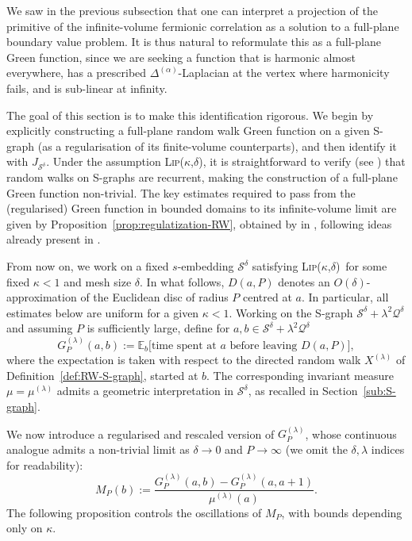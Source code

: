 \documentclass[reqno]{amsart}
\numberwithin{equation}{section}
\theoremstyle{definition}
\theoremstyle{remark}
\newcommand\cQ{\mathcal{Q}}
\newcommand\cS{\mathcal{S}}
\def\LipKd{{\mbox{\textsc{Lip(}$\kappa$\textsc{,}$\delta$\textsc{)}}}}
\begin{document}
We saw in the previous subsection that one can interpret a projection of the primitive of the infinite-volume fermionic correlation as a solution to a full-plane boundary value problem. It is thus natural to reformulate this as a full-plane Green function, since we are seeking a function that is harmonic almost everywhere, has a prescribed $\Delta^{(\alpha)}$-Laplacian at the vertex where harmonicity fails, and is sub-linear at infinity.

The goal of this section is to make this identification rigorous. We begin by explicitly constructing a full-plane random walk Green function on a given S-graph (as a regularisation of its finite-volume counterparts), and then identify it with $J_{\cS^\delta}$. Under the assumption \LipKd, it is straightforward to verify (see \cite[Section 6]{CLR1}) that random walks on S-graphs are recurrent, making the construction of a full-plane Green function non-trivial. The key estimates required to pass from the (regularised) Green function in bounded domains to its infinite-volume limit are given by Proposition~\ref{prop:regulatization-RW}, obtained by 
 in \cite[Proposition~3.1]{Bas23}, following ideas already present in \cite[Theorem~3.1]{CLR2}. 

From now on, we work on a fixed $s$-embedding $\cS^\delta$ satisfying \LipKd\, for some fixed $\kappa < 1$ and mesh size $\delta$. In what follows, $D(a,P)$ denotes an $O(\delta)$-approximation of the Euclidean disc of radius $P$ centred at $a$. In particular, all estimates below are uniform for a given
 $\kappa < 1$. Working on the S-graph $\cS^\delta + \lambda^2 \cQ^\delta$ and assuming $P$ is sufficiently large, define for $a,b \in \cS^\delta + \lambda^2 \cQ^\delta$
\begin{equation}\label{eq:Green-function}
G^{(\lambda)}_{P}(a,b) := \mathbb{E}_{b}\big[\text{time spent at } a \text{ before leaving } D(a,P)\big],
\end{equation}
where the expectation is taken with respect to the directed random walk $X^{(\lambda)}$ of Definition~\ref{def:RW-S-graph}, started at $b$. The corresponding invariant measure $\mu = \mu^{(\lambda)}$ admits a geometric interpretation in $\cS^\delta$, as recalled in Section~\ref{sub:S-graph}. 

We now introduce a regularised and rescaled version of $G^{(\lambda)}_{P}$, whose continuous analogue admits a non-trivial limit as $\delta \to 0$ and $P \to \infty$ (we omit the $\delta, \lambda$ indices for readability):
\begin{equation}\label{eq:regularized-scaled-Green-function}
	M_{P}(b) := \frac{G^{(\lambda)}_{P}(a,b) - G^{(\lambda)}_{P}(a,a+1)}{\mu^{(\lambda)}(a)}.
\end{equation}
The following proposition controls the oscillations of $M_P$, with bounds depending only on $\kappa$.
\end{document}
